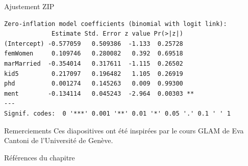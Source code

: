 \documentclass{BeamerTemplate}
\begin{document}
\begin{refsection}
\begin{frame}[fragile]{Ajustement ZIP}
{\begin{verbatim}
Zero-inflation model coefficients (binomial with logit link):
             Estimate Std. Error z value Pr(>|z|)   
(Intercept) -0.577059   0.509386  -1.133  0.25728   
femWomen     0.109746   0.280082   0.392  0.69518   
marMarried  -0.354014   0.317611  -1.115  0.26502   
kid5         0.217097   0.196482   1.105  0.26919   
phd          0.001274   0.145263   0.009  0.99300   
ment        -0.134114   0.045243  -2.964  0.00303 **
---
Signif. codes:  0 '***' 0.001 '**' 0.01 '*' 0.05 '.' 0.1 ' ' 1 
\end{verbatim}
}
\end{frame}

\begin{frame}{Remerciements}
Ces diapositives ont été inspirées par le cours GLAM de Eva Cantoni de l'Université de Genève.
\end{frame}

\begin{frame}[allowframebreaks]{Références du chapitre}
\tiny
\printbibliography[heading=none,section=\therefsection]
\end{frame}

\end{refsection}
\end{document}
